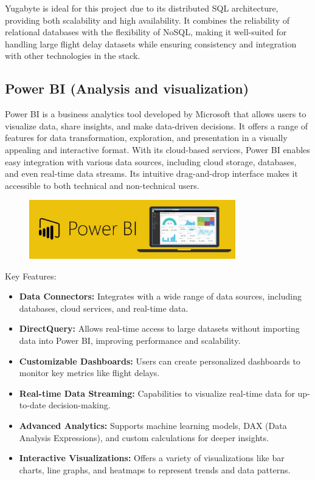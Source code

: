 \documentclass[12pt,a4paper]{article}
\begin{document}
Yugabyte is ideal for this project due to its distributed SQL architecture, providing both scalability and high availability. It combines the reliability of relational databases with the flexibility of NoSQL, making it well-suited for handling large flight delay datasets while ensuring consistency and integration with other technologies in the stack.

\subsection{Power BI (Analysis and visualization)}
Power BI is a business analytics tool developed by Microsoft that allows users to visualize data, share insights, and make data-driven decisions. It offers a range of features for data transformation, exploration, and presentation in a visually appealing and interactive format. With its cloud-based services, Power BI enables easy integration with various data sources, including cloud storage, databases, and even real-time data streams. Its intuitive drag-and-drop interface makes it accessible to both technical and non-technical users.
\begin{figure}[H]
    \begin{center}
        \includegraphics[width=0.8\textwidth]{Images/powerBI.png}
    \end{center}
\end{figure}

Key Features:
\begin{itemize}
    \item \textbf{Data Connectors:} Integrates with a wide range of data sources, including databases, cloud services, and real-time data.
    \item \textbf{DirectQuery:} Allows real-time access to large datasets without importing data into Power BI, improving performance and scalability.
    \item \textbf{Customizable Dashboards:} Users can create personalized dashboards to monitor key metrics like flight delays.
    \item \textbf{Real-time Data Streaming:} Capabilities to visualize real-time data for up-to-date decision-making.
    \item \textbf{Advanced Analytics:} Supports machine learning models, DAX (Data Analysis Expressions), and custom calculations for deeper insights.
    \item \textbf{Interactive Visualizations:} Offers a variety of visualizations like bar charts, line graphs, and heatmaps to represent trends and data patterns.
\end{itemize}
\end{document}
